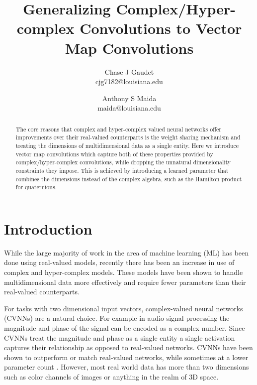 \documentclass[14pt,a4paper]{article}
\begin{document}
\title{Generalizing Complex/Hyper-complex Convolutions to Vector Map Convolutions}
\author{Chase J Gaudet \\  cjg7182@louisiana.edu
   \and Anthony S Maida \\  maida@louisiana.edu}
\maketitle

\begin{abstract}
The core reasons that complex and hyper-complex valued neural networks offer improvements over their real-valued counterparts is the weight sharing mechanism and treating the dimensions of multidimensional data as a single entity.
Here we introduce vector map convolutions which capture both of these properties provided by complex/hyper-complex convolutions, while dropping the unnatural dimensionality constraints they impose.
This is achieved by introducing a learned parameter that combines the dimensions instead of the  complex algebra, such as the Hamilton product for quaternions.
\end{abstract}

\section{Introduction}
While the large majority of work in the area of machine learning (ML) has been done using real-valued models, recently there has been an increase in use of complex and hyper-complex models.
These models have been shown to handle multidimensional data more effectively and require fewer parameters than their real-valued counterparts.

For tasks with two dimensional input vectors, complex-valued neural networks (CVNNs) are a natural choice.
For example in audio signal processing the magnitude and phase of the signal can be encoded as a complex number.
Since CVNNs treat the magnitude and phase as a single entity a single activation captures their relationship as opposed to real-valued networks.
CVNNs have been shown to outperform or match real-valued networks, while sometimes at a lower parameter count \cite{trabelsi+al-2018-complexconv, aizenberg2018image}.
However, most real world data has more than two dimensions such as color channels of images or anything in the realm of 3D space.
\end{document}

